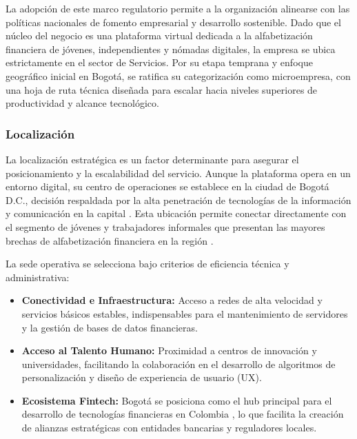 La adopción de este marco regulatorio permite a la organización alinearse con las políticas nacionales de fomento empresarial y desarrollo sostenible. Dado que el núcleo del negocio es una plataforma virtual dedicada a la alfabetización financiera de jóvenes, independientes y nómadas digitales, la empresa se ubica estrictamente en el sector de Servicios. Por su etapa temprana y enfoque geográfico inicial en Bogotá, se ratifica su categorización como microempresa, con una hoja de ruta técnica diseñada para escalar hacia niveles superiores de productividad y alcance tecnológico.

{}
\subsubsection*{Localización}


La localización estratégica es un factor determinante para asegurar el posicionamiento y la escalabilidad del servicio. Aunque la plataforma opera en un entorno digital, su centro de operaciones se establece en la ciudad de Bogotá D.C., decisión respaldada por la alta penetración de tecnologías de la información y comunicación en la capital \parencite{DANE_Internet2023}. Esta ubicación permite conectar directamente con el segmento de jóvenes y trabajadores informales que presentan las mayores brechas de alfabetización financiera en la región \parencite{DANE_Juventud2025}.

La sede operativa se selecciona bajo criterios de eficiencia técnica y administrativa:

\begin{itemize}
	\item \textbf{Conectividad e Infraestructura:} Acceso a redes de alta velocidad y servicios básicos estables, indispensables para el mantenimiento de servidores y la gestión de bases de datos financieras.
	
	\item \textbf{Acceso al Talento Humano:} Proximidad a centros de innovación y universidades, facilitando la colaboración en el desarrollo de algoritmos de personalización y diseño de experiencia de usuario (UX).
	
	\item \textbf{Ecosistema Fintech:} Bogotá se posiciona como el hub principal para el desarrollo de tecnologías financieras en Colombia \parencite{Finnovista2024}, lo que facilita la creación de alianzas estratégicas con entidades bancarias y reguladores locales.
\end{itemize}

